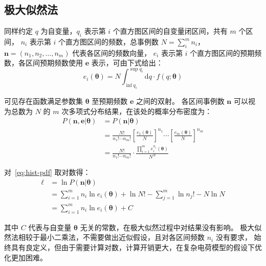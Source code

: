 \subsection{极大似然法}
同样约定 $q$ 为自变量，$q_i$ 表示第 $i$ 个直方图区间的自变量闭区间，共有 $m$ 个区间，
$n_i$ 表示第 $i$ 个直方图区间的频数，总事例数 $N=\sum_{i}^{m}n_i$，$\boldsymbol{n}=(n_1, n_2, \ldots, n_m)$ 代表各区间的频数向量，
$e_i$ 表示第 $i$ 个直方图区间的预期频数，各区间预期频数使用 $\boldsymbol{e}$ 表示，可由下式给出：
\begin{equation}
    e_i(\boldsymbol{\theta}) = N\int_{\inf q_i}^{\sup q_i}\mathrm{d}q\cdot f(q;\boldsymbol{\theta})
    \label{eq:ei}
\end{equation}

可见存在函数满足参数集 $\boldsymbol{\theta}$ 至预期频数 $\boldsymbol{e}$ 之间的双射。
各区间事例数 $\boldsymbol{n}$ 可以视为总数为 $N$ 的 $m$ 次多项式分布结果，在该处的概率分布密度为：
\begin{equation}
    \begin{aligned}
        P(\boldsymbol{n},\boldsymbol{e}|\boldsymbol{\theta})
        &=P(\boldsymbol{n}|\boldsymbol{\theta})\\
        &=\frac{N!}{n_1!\cdots n_m!}\left[\frac{e_1(\boldsymbol{\theta})}{N}\right]^{n_1}
        \cdots\left[\frac{e_m(\boldsymbol{\theta})}{N}\right]^{n_m}\\
        &=\frac{N!}{n_1!\cdots n_m!}\cdot\frac{\prod_{i=1}^{m}e_i^{n_i}(\boldsymbol{\theta})}{N^N}
    \end{aligned}
    \label{eq:hist-pdf}
\end{equation}

对~\eqref{eq:hist-pdf} 取对数得：
\begin{equation}
    \begin{aligned}
        \ell&=\ln P(\boldsymbol{n}|\boldsymbol{\theta})\\
        &=\sum_{i=1}^{m}n_i\ln{e_i(\boldsymbol{\theta})}
        +\ln{N!}-\sum_{j=1}^{m}\ln{n_j!}-N\ln{N}\\
        &=\sum_{i=1}^{m}n_i\ln{e_i(\boldsymbol{\theta})}+C
    \end{aligned}
    \label{eq:log-l}
\end{equation}

其中 $C$ 代表与自变量 $\boldsymbol{\theta}$ 无关的常数，在极大似然过程中对结果没有影响。
极大似然法相较于最小二乘法，不需要做出近似假设，且对各区间频数 $n_i$ 没有要求，
始终具有良定义，但由于需要计算对数，计算开销更大，在复杂电荷模型的假设下优化更加困难。

